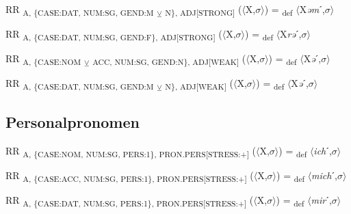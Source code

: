 {\begin{exe}
 RR \textsubscript{A, \{CASE:DAT, NUM:SG, GEND:M} \textsubscript{${\veebar}$}\textsubscript{ N\}, ADJ[STRONG]} ($\langle$X,$\sigma $$\rangle$) = \textsubscript{def} $\langle$X\textit{əm}ˊ,$\sigma $$\rangle$
\end{exe}

\begin{exe}
 RR \textsubscript{A, \{CASE:DAT, NUM:SG, GEND:F\}, ADJ[STRONG]} ($\langle$X,$\sigma $$\rangle$) = \textsubscript{def} $\langle$X\textit{rə}ˊ,$\sigma $$\rangle$
\end{exe}

\begin{exe}
 RR \textsubscript{A, \{CASE:NOM} \textsubscript{${\veebar}$}\textsubscript{ ACC, NUM:SG, GEND:N\}, ADJ[WEAK]} ($\langle$X,$\sigma $$\rangle$) = \textsubscript{def} $\langle$X\textit{ə}ˊ,$\sigma $$\rangle$
\end{exe}

\begin{exe}
 RR \textsubscript{A, \{CASE:DAT, NUM:SG, GEND:M} \textsubscript{${\veebar}$}\textsubscript{ N\}, ADJ[WEAK]} ($\langle$X,$\sigma $$\rangle$) = \textsubscript{def} $\langle$X\textit{ə}ˊ,$\sigma $$\rangle$
\end{exe}

\subsection{Personalpronomen}

\begin{exe}
 RR \textsubscript{A, \{CASE:NOM, NUM:SG, PERS:1\}, PRON.PERS[STRESS:+]} ($\langle$X,$\sigma $$\rangle$) = \textsubscript{def} $\langle$\textit{ich}ˊ,$\sigma $$\rangle$
\end{exe}

\begin{exe}
 RR \textsubscript{A, \{CASE:ACC, NUM:SG, PERS:1\}, PRON.PERS[STRESS:+]} ($\langle$X,$\sigma $$\rangle$) = \textsubscript{def} $\langle$\textit{mich}ˊ,$\sigma $$\rangle$
\end{exe}

\begin{exe}
 RR \textsubscript{A, \{CASE:DAT, NUM:SG, PERS:1\}, PRON.PERS[STRESS:+]} ($\langle$X,$\sigma $$\rangle$) = \textsubscript{def} $\langle$\textit{mir}ˊ,$\sigma $$\rangle$
\end{exe}

}
